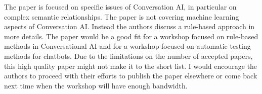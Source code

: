 The paper is focused on specific issues of Conversation AI, in particular on complex semantic relationships. The paper is not covering machine learning aspects of Conversation AI. Instead the authors discuss a rule-based approach in more details. The paper would be a good fit for a workshop focused on rule-based methods in Conversational AI and for a workshop focused on automatic testing methods for chatbots. Due to the limitations on the number of accepted papers, this high quality paper might not make it to the short list. I would encourage the authors to proceed with their efforts to publish the paper elsewhere or come back next time when the workshop will have enough bandwidth.